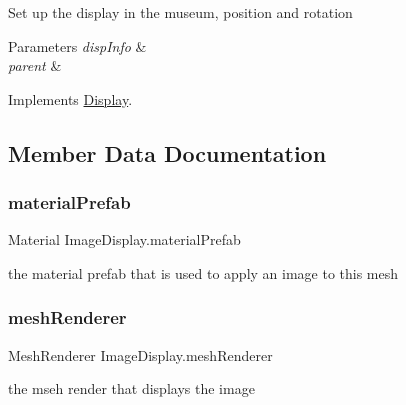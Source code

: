 Set up the display in the museum, position and rotation 


\begin{DoxyParams}{Parameters}
{\em disp\+Info} & \\
\hline
{\em parent} & \\
\hline
\end{DoxyParams}


Implements \mbox{\hyperlink{class_display_a57325251fbeac943cd48520e50f0bec4}{Display}}.



\subsection{Member Data Documentation}
\mbox{\label{class_image_display_a19b3e5d9b9fba307ab9f4529808b7768}} 
\subsubsection{\texorpdfstring{material\+Prefab}{materialPrefab}}
{\footnotesize\ttfamily Material Image\+Display.\+material\+Prefab\hspace{0.3cm}{\ttfamily [private]}}



the material prefab that is used to apply an image to this mesh 

\mbox{\label{class_image_display_ab96891e8a9d31e5fd90bff26b8485287}} 
\subsubsection{\texorpdfstring{mesh\+Renderer}{meshRenderer}}
{\footnotesize\ttfamily Mesh\+Renderer Image\+Display.\+mesh\+Renderer\hspace{0.3cm}{\ttfamily [private]}}



the mseh render that displays the image 

\mbox{\label{class_image_display_a8ecd7f162065170c3f5cbcf906b11873}} 
